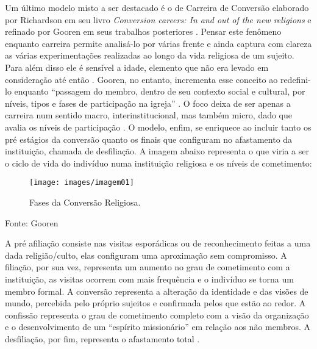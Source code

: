 \documentclass[
	12pt,				%
	oneside,			%
	a4paper,			%
	sumario=tradicional,
	english,			%
	brazil				%
	]{abntex2}
\newcommand{\bcenter}{\begin{center}}
\newcommand{\ecenter}{\end{center}}
\begin{document}
Um último modelo misto a ser destacado é o de Carreira de Conversão elaborado por Richardson\autocite*{richardson_conversion_1977} em seu livro \emph{Conversion careers: In and out of the new religions} e refinado por Gooren em seus trabalhos posteriores \autocite*{gooren_reassessing_2007-1,gooren_religious_2010-1}. Pensar este fenômeno enquanto carreira permite analisá-lo por várias frente e ainda captura com clareza as várias experimentações realizadas ao longo da vida religiosa de um sujeito. Para além disso ele é sensível a idade, elemento que não era levado em consideração até então \autocite[49]{richardson_active_1985}. Gooren, no entanto, incrementa esse conceito ao redefini-lo enquanto ``passagem do membro, dentro de seu contexto social e cultural, por níveis, tipos e fases de participação na igreja'' \autocite[349]{gooren_reassessing_2007-1}. O foco deixa de ser apenas a carreira num sentido macro, interinstitucional, mas também micro, dado que avalia os níveis de participação \autocite{girardo_rodriguez_religious_2021}. O modelo, enfim, se enriquece ao incluir tanto os pré estágios da conversão quanto os finais que configuram no afastamento da instituição, chamada de desfiliação. A imagem abaixo representa o que viria a ser o ciclo de vida do indivíduo numa instituição religiosa e os níveis de cometimento:
\begin{figure}[H]

{\centering \texttt{[image: images/imagem01]} 

}

\caption{Fases da Conversão Religiosa.}\label{fig:imagem}
\end{figure}
\bcenter

Fonte: Gooren\autocite*{gooren_reassessing_2007-1}
\ecenter

A pré afiliação consiste nas visitas esporádicas ou de reconhecimento feitas a uma dada religião/culto, elas configuram uma aproximação sem compromisso. A filiação, por sua vez, representa um aumento no grau de cometimento com a instituição, as visitas ocorrem com mais frequência e o indivíduo se torna um membro formal. A conversão representa a alteração da identidade e das visões de mundo, percebida pelo próprio sujeitos e confirmada pelos que estão ao redor. A confissão representa o grau de cometimento completo com a visão da organização e o desenvolvimento de um ``espírito missionário'' em relação aos não membros. A desfiliação, por fim, representa o afastamento total \autocite[350]{gooren_reassessing_2007-1}.
\end{document}
